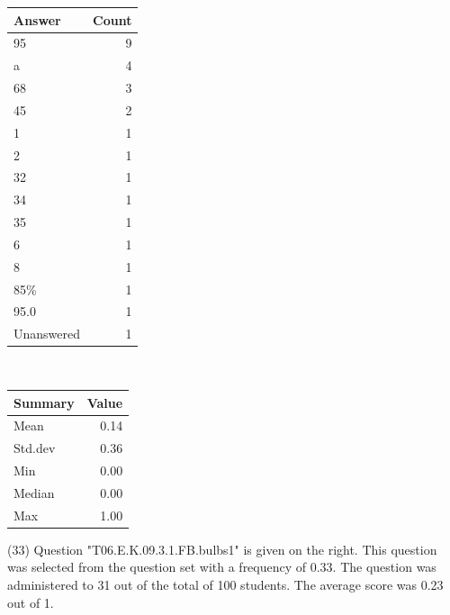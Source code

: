 \documentclass[12pt,nohyper]{tufte-handout}\usepackage[]{graphicx}\usepackage[]{color}
\begin{document}
\begin{center}%
\begin{tabular}{lr}
  \hline
Answer & Count \\ 
  \hline
95 &   9 \\ 
  a &   4 \\ 
  68 &   3 \\ 
  45 &   2 \\ 
  1 &   1 \\ 
  2 &   1 \\ 
  32 &   1 \\ 
  34 &   1 \\ 
  35 &   1 \\ 
  6 &   1 \\ 
  8 &   1 \\ 
  85\% &   1 \\ 
  95.0 &   1 \\ 
  Unanswered &   1 \\ 
   \hline
\end{tabular}
~~~~~~~~%
\begin{tabular}{lr}
  \hline
Summary & Value \\ 
  \hline
Mean & 0.14 \\ 
  Std.dev & 0.36 \\ 
  Min & 0.00 \\ 
  Median & 0.00 \\ 
  Max & 1.00 \\ 
   \hline
\end{tabular}
\end{center}\newpage{} (33) Question "T06.E.K.09.3.1.FB.bulbs1" is given on the right. This question was selected from the question set with a frequency of 0.33. The question was administered to 31 out of the total of 100 students. The average score was 0.23 out of 1.
\end{document}
